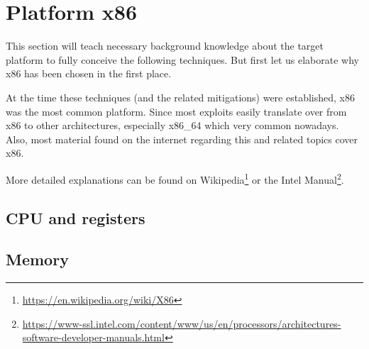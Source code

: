 \documentclass[article]{uibk}
\begin{document}
\section{Platform x86}

This section will teach necessary background knowledge about the target
platform to fully conceive the following techniques. But first let us elaborate
why x86 has been chosen in the first place.

At the time these techniques (and the related mitigations) were established,
x86 was the most common platform. Since most exploits easily translate over
from x86 to other architectures, especially x86\_64 which very common nowadays.
Also, most material found on the internet regarding this and related topics
cover x86.

More detailed explanations can be found on
Wikipedia\footnote{\url{https://en.wikipedia.org/wiki/X86}} or the Intel
Manual\footnote{\url{https://www-ssl.intel.com/content/www/us/en/processors/architectures-software-developer-manuals.html}}.

\subsection{CPU and registers}

\subsection{Memory}

\newpage


\end{document}
